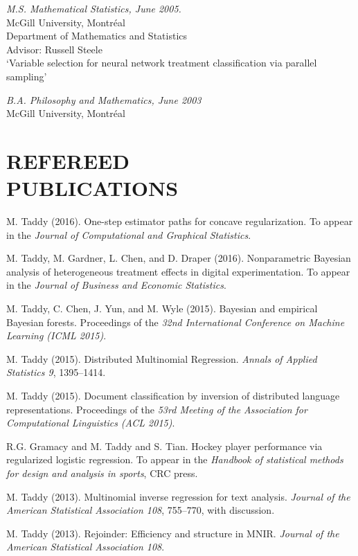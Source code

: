\documentclass[margin,line]{res}
\begin{document}
\begin{resume}
\vspace{-0.2cm}
{\it M.S. Mathematical Statistics, June 2005.}\\
{\sc McGill University, Montr\'eal}\\
Department of Mathematics and Statistics\\
Advisor: Russell Steele\\
`Variable selection for neural network treatment classification via parallel sampling'

\vspace{-0.2cm}
{\it B.A. Philosophy and Mathematics, June 2003}\\
{\sc McGill University, Montr\'eal}


\section{\bf REFEREED \\PUBLICATIONS}


M. Taddy (2016). One-step estimator paths for concave regularization.  To appear in the {\em Journal of Computational and Graphical Statistics}.

M. Taddy, M. Gardner, L. Chen, and D. Draper (2016).  Nonparametric Bayesian analysis of heterogeneous treatment effects in digital experimentation.  To appear in the {\em Journal of Business and Economic Statistics}.

M. Taddy, C. Chen, J. Yun, and M. Wyle (2015). Bayesian and empirical Bayesian forests.  Proceedings of the {\em 32nd International Conference on Machine Learning (ICML 2015)}.

M. Taddy (2015). Distributed Multinomial Regression.  {\em Annals of Applied Statistics 9}, 1395--1414.

M. Taddy (2015). Document classification by inversion of distributed language representations. Proceedings of the {\em 53rd Meeting of the Association for Computational Linguistics (ACL 2015)}.

R.G. Gramacy and M. Taddy and S. Tian.  Hockey player performance via regularized logistic regression.
To appear in the {\it Handbook of statistical methods for design and analysis in sports}, CRC press.

M. Taddy (2013).  Multinomial inverse regression for text analysis.  
{\it Journal of the American Statistical
  Association 108}, 755--770, with discussion.

M. Taddy (2013).   Rejoinder: Efficiency and structure in MNIR.  {\it Journal of the American Statistical
  Association 108}.



\end{resume}
\end{document}
